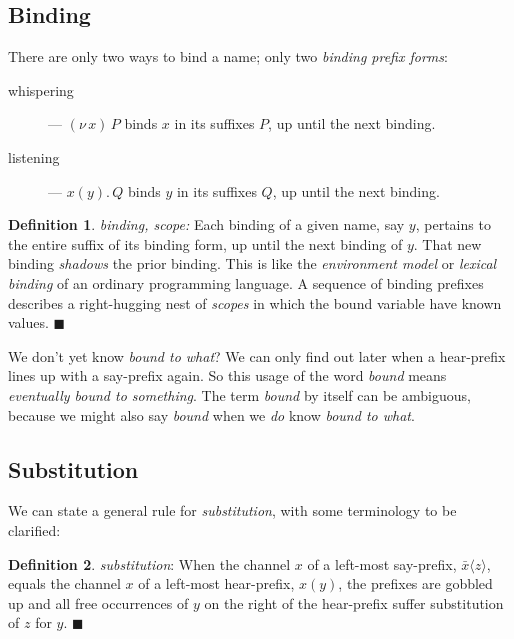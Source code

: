 \documentclass[10pt,oneside,x11names]{article}
\newcommand\listening  [3]{#1(#2).\,#3}
\newcommand\whispering [2]{(\nu\,#1)\,{#2}}
\theoremstyle{definition}
\newtheorem{definition}{Definition}
\theoremstyle{warning}
\begin{document}
\newpage
\subsection{Binding}
\label{sec:org93ace7c}

There are only two ways to bind a name; only two \emph{binding prefix forms}:

\begin{description}
\item[{whispering}] --- \(\whispering{x}{P}\) binds \(x\) in its suffixes
\(P\), up until the next binding.

\item[{listening}] --- \(\listening{x}{y}{Q}\) binds \(y\) in its suffixes
\(Q\), up until the next binding.
\end{description}

\label{def:binding}
\begin{definition}{\emph{binding, scope:}}
  Each binding of a given name, say $y$, pertains to the entire
  suffix of its binding form, up until the next binding of $y$.
  That new binding
  \emph{shadows} the prior binding. This is like  the
  \emph{environment model} or \emph{lexical binding} of an
  ordinary programming language.
  A sequence of binding prefixes describes a right-hugging
  nest of \emph{scopes} in which the bound variable have known values.
  $\blacksquare$
\end{definition}

We don't yet know \emph{bound to what}? We can only find out later when
a hear-prefix lines up with a say-prefix again. So this usage of
the word \emph{bound} means \emph{eventually bound to something}. The term
\emph{bound} by itself can be ambiguous, because we might also say
\emph{bound} when we \emph{do} know \emph{bound to what}.

\subsection{Substitution}
\label{sec:orgd04f40a}

We can state a general rule for \emph{substitution}, with some
terminology to be clarified:

\label{def:substitution}
\begin{definition}{\emph{substitution}:}
  When the channel $x$ of a left-most say-prefix, $\bar{x}\langle{z}\rangle$,
  equals the channel $x$ of a left-most hear-prefix, $x(y)$, the prefixes
  are gobbled up and all free occurrences of $y$ on the
  right of the hear-prefix suffer substitution of $z$ for $y$.
  $\blacksquare$
\end{definition}
\end{document}

